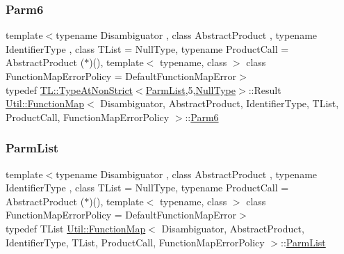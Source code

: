\subsubsection{\texorpdfstring{Parm6}{Parm6}\hspace{0.1cm}{\footnotesize\ttfamily [2/2]}}
{\footnotesize\ttfamily template$<$typename Disambiguator , class Abstract\+Product , typename Identifier\+Type , class T\+List  = Null\+Type, typename Product\+Call  = Abstract\+Product ($\ast$)(), template$<$ typename, class $>$ class Function\+Map\+Error\+Policy = Default\+Function\+Map\+Error$>$ \\
typedef \mbox{\hyperlink{structUtil_1_1TL_1_1TypeAtNonStrict}{T\+L\+::\+Type\+At\+Non\+Strict}}$<$\mbox{\hyperlink{classUtil_1_1FunctionMap_a6cf0e6766cf6f20642ba61c4994bb477}{Parm\+List}},5,\mbox{\hyperlink{classUtil_1_1NullType}{Null\+Type}}$>$\+::Result \mbox{\hyperlink{classUtil_1_1FunctionMap}{Util\+::\+Function\+Map}}$<$ Disambiguator, Abstract\+Product, Identifier\+Type, T\+List, Product\+Call, Function\+Map\+Error\+Policy $>$\+::\mbox{\hyperlink{classUtil_1_1FunctionMap_ae121f4a5c3534a888db59d6702a15b40}{Parm6}}}

\mbox{\label{classUtil_1_1FunctionMap_a6cf0e6766cf6f20642ba61c4994bb477}} 
\subsubsection{\texorpdfstring{ParmList}{ParmList}\hspace{0.1cm}{\footnotesize\ttfamily [1/2]}}
{\footnotesize\ttfamily template$<$typename Disambiguator , class Abstract\+Product , typename Identifier\+Type , class T\+List  = Null\+Type, typename Product\+Call  = Abstract\+Product ($\ast$)(), template$<$ typename, class $>$ class Function\+Map\+Error\+Policy = Default\+Function\+Map\+Error$>$ \\
typedef T\+List \mbox{\hyperlink{classUtil_1_1FunctionMap}{Util\+::\+Function\+Map}}$<$ Disambiguator, Abstract\+Product, Identifier\+Type, T\+List, Product\+Call, Function\+Map\+Error\+Policy $>$\+::\mbox{\hyperlink{classUtil_1_1FunctionMap_a6cf0e6766cf6f20642ba61c4994bb477}{Parm\+List}}}

